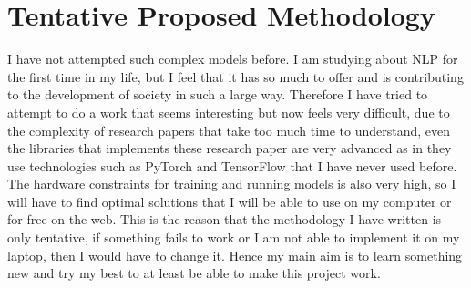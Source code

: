 \documentclass[11pt,a4paper]{article}
\begin{document}
	\section{Tentative Proposed Methodology}
	\label{sec:length}
	I have not attempted such complex models before. I am studying about NLP for the first time in my life, but I feel that it has so much to offer and is contributing to the development of society in such a large way. Therefore I have tried to attempt to do a work that seems interesting but now feels very difficult, due to the complexity of research papers that take too much time to understand, even the libraries that implements these research paper are very advanced as in they use technologies such as PyTorch and TensorFlow that I have never used before. The hardware constraints for training and running models is also very high, so I will have to find optimal solutions that I will be able to use on my computer or for free on the web.  This is the reason that the methodology I have written is only tentative, if something fails to work or I am not able to implement it on my laptop, then I would have to change it.
	Hence my main aim is to learn something new and try my best to at least be able to make this project work.
	
\end{document}
